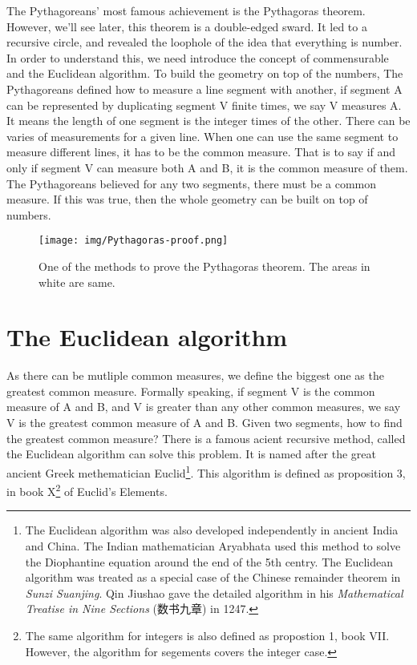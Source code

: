 \documentclass[b5paper]{article}
\begin{document}
The Pythagoreans' most famous achievement is the Pythagoras theorem. However, we'll see later, this theorem is a double-edged sward. It led to a recursive circle, and revealed the loophole of the idea that everything is number. In order to understand this, we need introduce the concept of commensurable and the Euclidean algorithm. To build the geometry on top of the numbers, The Pythagoreans defined how to measure a line segment with another, if segment A can be represented by duplicating segment V finite times, we say V measures A. It means the length of one segment is the integer times of the other. There can be varies of measurements for a given line. When one can use the same segment to measure different lines, it has to be the common measure. That is to say if and only if segment V can measure both A and B, it is the common measure of them. The Pythagoreans believed for any two segments, there must be a common measure. If this was true, then the whole geometry can be built on top of numbers.

\begin{figure}[htbp]
 \centering
 \texttt{[image: img/Pythagoras-proof.png]}
 \caption{One of the methods to prove the Pythagoras theorem. The areas in white are same.}
 \label{fig:Pythagoras-proof}
\end{figure}

\section{The Euclidean algorithm}

As there can be mutliple common measures, we define the biggest one as the greatest common measure. Formally speaking, if segment V is the common measure of A and B, and V is greater than any other common measures, we say V is the greatest common measure of A and B. Given two segments, how to find the greatest common measure? There is a famous acient recursive method, called the Euclidean algorithm can solve this problem. It is named after the great ancient Greek methematician Euclid\footnote{The Euclidean algorithm was also developed independently in ancient India and China. The Indian mathematician Aryabhata used this method to solve the Diophantine equation around the end of the 5th centry. The Euclidean algorithm was treated as a special case of the Chinese remainder theorem in {\em Sunzi Suanjing}. Qin Jiushao gave the detailed algorithm in his {\em Mathematical Treatise in Nine Sections} (数书九章) in 1247.}. This algorithm is defined as proposition 3, in book X\footnote{The same algorithm for integers is also defined as propostion 1, book VII. However, the algorithm for segements covers the integer case.} of Euclid's Elements\cite{Elements}.
\end{document}
